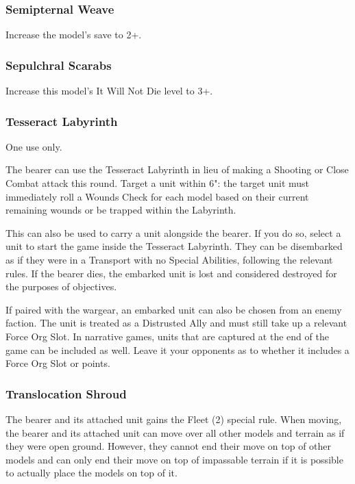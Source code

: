 \subsubsection{Semipternal Weave} \label{Sempiternal Weave}

Increase the model's save to 2+.

\subsubsection{Sepulchral Scarabs} \label{Sepulchral Scarabs}

Increase this model's It Will Not Die level to 3+.

\subsubsection{Tesseract Labyrinth} \label{Tesseract Labyrinth}

One use only.

The bearer can use the Tesseract Labyrinth in lieu of making a Shooting or Close Combat attack this round. Target a unit within 6": the target unit must immediately roll a Wounds Check for each model based on their current remaining wounds or be trapped within the Labyrinth.

This can also be used to carry a unit alongside the bearer. If you do so, select a unit to start the game inside the Tesseract Labyrinth. They can be disembarked as if they were in a Transport with no Special Abilities, following the relevant rules. If the bearer dies, the embarked unit is lost and considered destroyed for the purposes of objectives.

If paired with the  wargear, an embarked unit can also be chosen from an enemy faction. The unit is treated as a Distrusted Ally and must still take up a relevant Force Org Slot. In narrative games, units that are captured at the end of the game can be included as well. Leave it your opponents as to whether it includes a Force Org Slot or points.

\subsubsection{Translocation Shroud} \label{Translocation Shroud}

The bearer and its attached unit gains the Fleet (2) special rule. When moving, the bearer and its attached unit can move over all other models and terrain as if they were open ground. However, they cannot end their move on top of other models and can only end their move on top of impassable terrain if it is possible to actually place the models on top of it.

